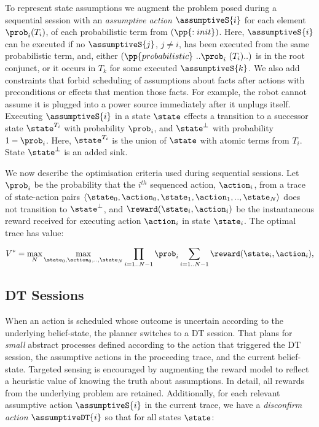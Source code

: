To represent state assumptions we augment the problem posed during
a sequential session with an \emph{assumptive action} $\assumptiveS{i}$ for
each element $\prob_i (T_i)$, of each probabilistic term from
$(\pp{:init})$. Here, $\assumptiveS{i}$ can be executed if no
$\assumptiveS{j}$, $j \neq i$, has been executed from the same
probabilistic term, and, either
$(\pp{probabilistic}~..\prob_i~(T_i)..)$ is in the root conjunct, or
it occurs in $T_k$ for some executed $\assumptiveS{k}$.
We also add constraints that forbid scheduling of
assumptions about facts after actions with preconditions or effects
that mention those facts. For example, the robot cannot assume it is
plugged into a power source immediately after it unplugs itself.
Executing $\assumptiveS{i}$ in a state $\state$ effects a transition
to a successor state $\state^{T_i}$ with probability $\prob_i$, and
$\state^\bot$ with probability $1 - \prob_i$. Here, $\state^{T_i}$ is
the union of $\state$ with atomic terms from $T_i$. State
$\state^\bot$ is an added sink.


We now describe the optimisation criteria used during sequential
sessions. Let $\prob_i$ be the probability that the $i^{th}$ sequenced
action, $\action_i$, from a trace of state-action pairs
$\langle \state_0, \action_0,\state_1, \action_1,.., \state_N \rangle$
does not transition to $\state^\bot$, and
$\reward(\state_i, \action_i)$ be the instantaneous reward received
for executing action $\action_i$ in state $\state_i$. The optimal
trace has value:

\small
\[
V^* = \max_N \max_{\state_0, \action_0,.., \state_N} \prod_{i=1..N-1} \prob_i \sum_{i=1..N-1}
\reward(\state_i, \action_i),
\]
\normalsize

\subsection{DT Sessions}

When an action is scheduled whose outcome is uncertain according to
the underlying belief-state, the planner switches to a DT
session. That plans for {\em small} abstract processes defined
according to the action that triggered the DT session, the assumptive
actions in the proceeding trace, and the current
belief-state. Targeted sensing is encouraged by augmenting the reward
model to reflect a heuristic value of knowing the truth about
assumptions. In detail, all rewards from the underlying problem are
retained. Additionally, for each relevant assumptive action
$\assumptiveS{i}$ in the current trace, we have a {\em disconfirm
action} $\assumptiveDT{i}$ so that for all states $\state$:

